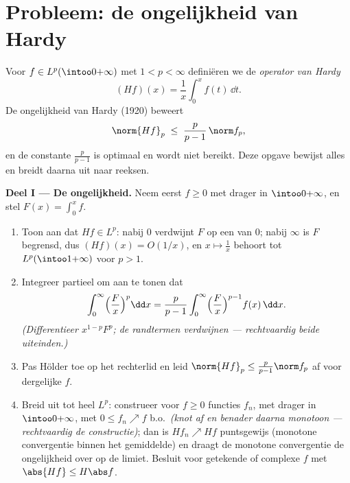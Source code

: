 \section{Probleem: de ongelijkheid van Hardy}

\begin{problem}\label{pb:b3:lp:1}
Voor $f \in L^p(\intoo0{+\infty})$ met $1 < p < \infty$
definiëren we de \emph{operator van Hardy}
\[
(Hf)(x) = \frac1x\int_0^x f(t)\,\dd t .
\]
De ongelijkheid van Hardy (1920) beweert
\[
\norm{Hf}_p \;\leq\; \frac{p}{p-1}\,\norm f_p ,
\]
en de constante $\frac p{p-1}$ is optimaal en wordt niet bereikt.
Deze opgave bewijst alles en breidt daarna uit naar reeksen.

\medskip
\noindent\textbf{Deel I --- De ongelijkheid.} Neem eerst $f \geq
0$  met  drager in $\intoo0{+\infty}$, en stel
$F(x) = \int_0^xf$.
\begin{enumerate}
  \item Toon aan dat $Hf \in L^p$: nabij $0$ verdwijnt $F$ op een
         van $0$; nabij $\infty$ is $F$ begrensd, dus
        $(Hf)(x) = O(1/x)$, en $x \mapsto \frac1x$ behoort tot
        $L^p(\intoo1{+\infty})$ voor $p > 1$.
  \item Integreer partieel om aan te tonen dat
        \[
        \int_0^\infty \Bigl(\frac Fx\Bigr)^p\dd x
        = \frac{p}{p-1}\int_0^\infty\Bigl(\frac
        Fx\Bigr)^{p-1}f(x)\,\dd x .
        \]
        \emph{(Differentieer $x^{1-p}F^p$; de randtermen
        verdwijnen --- rechtvaardig beide uiteinden.)}
  \item Pas Hölder toe op het rechterlid en leid
        $\norm{Hf}_p \leq \frac p{p-1}\norm f_p$ af voor
        dergelijke $f$.
  \item Breid uit tot heel $L^p$: construeer voor $f \geq 0$
        functies $f_n$,  met  drager in
        $\intoo0{+\infty}$, met $0 \leq f_n \nearrow f$ b.o.\
        \emph{(knot af en benader daarna monotoon ---
        rechtvaardig de constructie)}; dan is $Hf_n \nearrow Hf$
        puntsgewijs (monotone convergentie binnen het
        gemiddelde) en draagt de monotone convergentie de
        ongelijkheid over op de limiet. Besluit voor getekende
        of complexe $f$ met $\abs{Hf} \leq H\abs f$.
\end{enumerate}


\end{problem}
